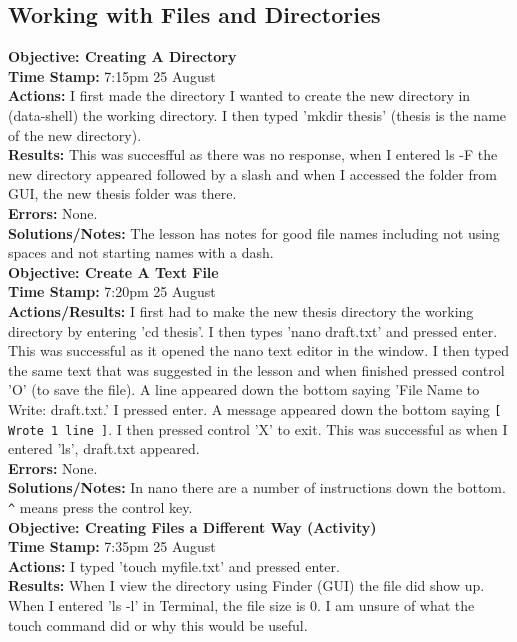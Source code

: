 \documentclass{article}
\begin{document}
\begin{FlushLeft}
\subsection{Working with Files and Directories}
\textbf{Objective: Creating A Directory}\\ 
\textbf{Time Stamp:} 7:15pm 25 August\\
\textbf{Actions:} I first made the directory I wanted to create the new directory in (data-shell) the working directory. I then typed 'mkdir thesis' (thesis is the name of the new directory). \\
\textbf{Results:} This was succesfful as there was no response, when I entered ls -F the new directory appeared followed by a slash and when I accessed the folder from GUI, the new thesis folder was there. \\
\textbf{Errors:} None. \\
\textbf{Solutions/Notes:} The lesson has notes for good file names including not using spaces and not starting names with a dash.\\
\vspace{5mm}
\textbf{Objective: Create A Text File}\\ 
\textbf{Time Stamp:} 7:20pm 25 August\\
\textbf{Actions/Results:} I first had to make the new thesis directory the working directory by entering 'cd thesis'. I then types 'nano draft.txt' and pressed enter. This was successful as it opened the nano text editor in the window. I then typed the same text that was suggested in the lesson and when finished pressed control 'O' (to save the file). A line appeared down the bottom saying 'File Name to Write: draft.txt.' I pressed enter. A message appeared down the bottom saying \verb|[ Wrote 1 line ]|. I then pressed control 'X' to exit. This was successful as when I entered 'ls', draft.txt appeared.\\
\textbf{Errors:} None. \\
\textbf{Solutions/Notes:} In nano there are a number of instructions down the bottom. \verb|^| means press the control key.\\
\vspace{5mm}
\textbf{Objective: Creating Files a Different Way (Activity)}\\ 
\textbf{Time Stamp:} 7:35pm 25 August\\
\textbf{Actions:} I typed 'touch my\textunderscore file.txt' and pressed enter.\\
\textbf{Results:} When I view the directory using Finder (GUI) the file did show up. When I entered 'ls -l' in Terminal, the file size is 0. I am unsure of what the touch command did or why this would be useful. \\

\end{FlushLeft}
\end{document}
